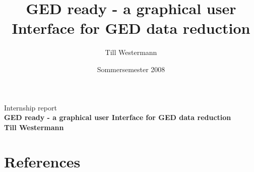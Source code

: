 \documentclass[german,a4paper,12pt,oneside]{paper}
\begin{document}



\title{\Huge GED ready - a graphical user Interface for GED data reduction }
\author{Till Westermann}
\date{Sommersemester 2008}
\thispagestyle{empty}
\begin{center}
\Large Internship report \\  \vspace{3.0cm}
\Huge\sffamily\bfseries GED ready - a graphical user Interface for GED data reduction  \normalsize  \\ 
\vspace{10.0cm}
Till Westermann 
\end{center}

\newpage\thispagestyle{empty}



\tableofcontents
 \newpage\thispagestyle{plain}

\pagestyle{plain}
%
\clearpage\newpage
\setcounter{section}{0}

   
   
      

\section{References} 

\end{document}
